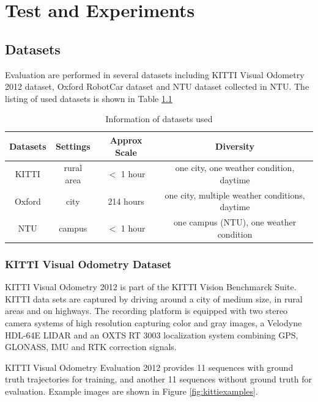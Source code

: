 
\chapter{Test and Experiments}

\section{Datasets}

Evaluation are performed in several datasets including KITTI Visual Odometry 2012 dataset\cite{Geiger2012CVPR},  Oxford RobotCar dataset\cite{maddern20171} and NTU dataset collected in NTU. The listing of used datasets is shown in Table \ref{tbl:datasetsinfo}


\begin{table}
	\centering
	\caption{Information of datasets used }
	\begin{tabular}{|c|c|c|c|}
		\hline
		Datasets & Settings & Approx Scale & Diversity \\
		\hline
		KITTI &  rural area & $<$ 1 hour & one city, one weather condition, daytime \\
		\hline
		Oxford &  city & 214 hours & one city, multiple weather conditions, daytime \\
		\hline
		NTU &  campus & $<$ 1 hour & one campus (NTU), one weather condition \\
		\hline
	\end{tabular}
	\label{tbl:datasetsinfo}
\end{table}

\subsection{KITTI Visual Odometry Dataset}

KITTI Visual Odometry 2012 is part of the \cite{Geiger2012CVPR, Menze2015CVPR} KITTI Vision Benchmarck Suite. KITTI data sets are captured by driving around a city of medium size, in rural areas and on highways. The recording platform is equipped with two stereo camera systems of high resolution capturing color and gray images, a Velodyne HDL-64E LIDAR and an OXTS RT 3003 localization system combining GPS, GLONASS, IMU and RTK correction signals. 

KITTI Visual Odometry Evaluation 2012 provides 11 sequences with ground truth trajectories for training, and another 11 sequences without ground truth for evaluation. Example images are shown in Figure \ref{fig:kittiexamples}. 

